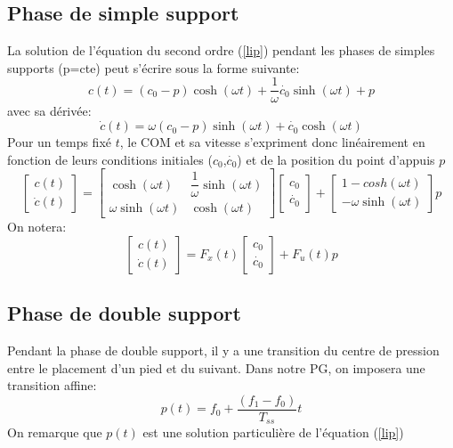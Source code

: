\documentclass[10pt,a4paper]{article}
\begin{document}
\subsection{Phase de simple support}
La solution de l'équation du second ordre (\ref{lip}) pendant les phases de simples supports (p=cte) peut s'écrire sous la forme suivante:
\begin{equation}
c(t)=(c_0-p)\cosh(\omega t)+\dfrac{1}{\omega}\dot{c_0}\sinh(\omega t)+p
\end{equation}
avec sa dérivée:
\begin{equation}
\dot{c}(t)=\omega(c_0-p)\sinh(\omega t)+\dot{c_0}\cosh(\omega t)
\end{equation}
Pour un temps fixé $t$, le COM et sa vitesse s'expriment donc linéairement en fonction de leurs conditions initiales ($c_0$,$\dot{c_0}$) et de la position du point d'appuis $p$
\begin{equation}
\begin{bmatrix} 
c(t) \\
\dot{c}(t) 
\end{bmatrix} 
= 
\begin{bmatrix} 
\cosh(\omega t) 		&	 \dfrac{1}{\omega}\sinh(\omega t) \\
\omega\sinh(\omega t)	&	 \cosh(\omega t)
\end{bmatrix}
\begin{bmatrix} 
c_0 \\
\dot{c_0}
\end{bmatrix} 
+
\begin{bmatrix} 
1-cosh(\omega t) 		 \\
-\omega\sinh(\omega t)	
\end{bmatrix}
p
\end{equation}
On notera:
\begin{equation}
\begin{bmatrix} 
c(t) \\
\dot{c}(t) 
\end{bmatrix} 
= 
F_x(t)
\begin{bmatrix} 
c_0 \\
\dot{c_0}
\end{bmatrix} 
+
F_u(t) p
\end{equation}
\subsection{Phase de double support}
Pendant la phase de double support, il y a une transition du centre de pression entre le placement d'un pied et du suivant. Dans notre PG, on imposera une transition affine:
\begin{equation}
p(t)=f_0+\frac{(f_1-f_0)}{T_{ss}}t
\end{equation}
On remarque que $p(t)$ est une solution particulière de l'équation (\ref{lip}) 
\end{document}
